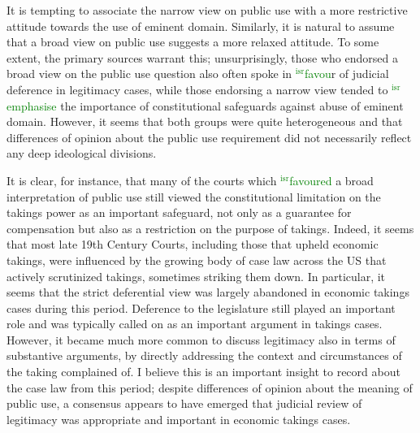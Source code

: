 \documentclass[12pt,a4paper]{book} %
\newcommand{\isr}[1]{\textcolor{green}{$^{\textrm{isr}}${#1}}}
\begin{document}

It is tempting to associate the narrow view on public use with a more restrictive attitude towards the use of eminent domain. Similarly, it is natural to assume that a broad view on public use suggests a more relaxed attitude. To some extent, the primary sources warrant this; unsurprisingly, those who endorsed a broad view on the public use question also often spoke in \isr{favou}r of judicial deference in legitimacy cases, while those endorsing a narrow view tended to \isr{emphasise} the importance of constitutional safeguards against abuse of eminent domain. However, it seems that both groups were quite heterogeneous and that differences of opinion about the public use requirement did not necessarily reflect any deep ideological divisions.

It is clear, for instance, that many of the courts which \isr{favoured} a broad interpretation of public use still viewed the constitutional limitation on the takings power as an important safeguard, not only as a guarantee for compensation but also as a restriction on the purpose of takings. Indeed, it seems that most late 19th Century Courts, including those that upheld economic takings, were influenced by the growing body of case law across the US that actively scrutinized takings, sometimes striking them down. In particular, it seems that the strict deferential view was largely abandoned in economic takings cases during this period. Deference to the legislature still played an important role and was typically called on as an important argument in takings cases. However, it became much more common to discuss legitimacy also in terms of substantive arguments, by directly addressing the context and circumstances of the taking complained of. I believe this is an important insight to record about the case law from this period; despite differences of opinion about the meaning of public use, a consensus appears to have emerged that judicial review of legitimacy was appropriate and important in economic takings cases.
\end{document}
